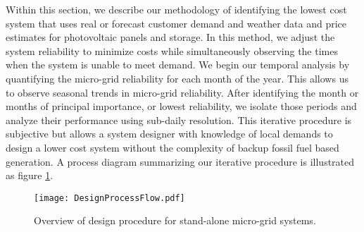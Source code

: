 \documentclass[11p]{article}
\begin{document}
Within this section, we describe our methodology of identifying the lowest cost system that uses real or forecast customer demand and weather data and price estimates for photovoltaic panels and storage.
In this method, we adjust the system reliability to minimize costs while simultaneously observing the times when the system is unable to meet demand.  
We begin our temporal analysis by quantifying the micro-grid reliability for each month of the year. 
This allows us to observe seasonal trends in micro-grid reliability. 
After identifying the month or months of principal importance, or lowest reliability, we isolate those periods and analyze their performance using sub-daily resolution. 
This iterative procedure is subjective but allows a system designer with knowledge of local demands to design a lower cost system without the complexity of backup fossil fuel based generation.
A process diagram summarizing our iterative procedure is illustrated as figure \ref{FlowChart}. 


\begin{figure}
\centering
\texttt{[image: DesignProcessFlow.pdf]}
\caption{Overview of design procedure for stand-alone micro-grid systems.}

\label{FlowChart}
\end{figure}
\end{document}
